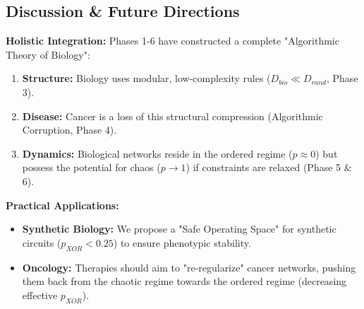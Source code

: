 \documentclass[11pt]{article}
\begin{document}
\subsection{Discussion \& Future Directions}
\textbf{Holistic Integration:}
Phases 1-6 have constructed a complete "Algorithmic Theory of Biology":
\begin{enumerate}
    \item \textbf{Structure:} Biology uses modular, low-complexity rules ($D_{bio} \ll D_{rand}$, Phase 3).
    \item \textbf{Disease:} Cancer is a loss of this structural compression (Algorithmic Corruption, Phase 4).
    \item \textbf{Dynamics:} Biological networks reside in the ordered regime ($p \approx 0$) but possess the potential for chaos ($p \to 1$) if constraints are relaxed (Phase 5 \& 6).
\end{enumerate}
\textbf{Practical Applications:}
\begin{itemize}
    \item \textbf{Synthetic Biology:} We propose a "Safe Operating Space" for synthetic circuits ($p_{XOR} < 0.25$) to ensure phenotypic stability.
    \item \textbf{Oncology:} Therapies should aim to "re-regularize" cancer networks, pushing them back from the chaotic regime towards the ordered regime (decreasing effective $p_{XOR}$).
\end{itemize}



\end{document}
